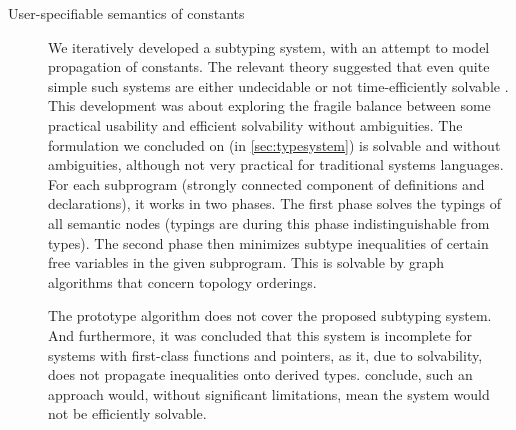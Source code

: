 \begin{description}
    \item[User-specifiable semantics of constants] We iteratively developed a subtyping system, with an attempt to model propagation of constants. The relevant theory suggested that even quite simple such systems are either undecidable or not time-efficiently solvable \cite{tiuryn1992subtype, frey1997subtype}. This development was about  exploring the fragile balance between some practical usability and efficient solvability without ambiguities. The formulation we concluded on (in \cref{sec:typesystem}) is solvable and without ambiguities, although not very practical for traditional systems languages. For each subprogram (strongly connected component of definitions and declarations), it works in two phases. The first phase solves the typings of all semantic nodes (typings are during this phase indistinguishable from types). The second phase then minimizes subtype inequalities of certain free variables in the given subprogram. This is solvable by graph algorithms that concern topology orderings.

    The prototype algorithm does not cover the proposed subtyping system. And furthermore, it was concluded that this system is incomplete for systems with first-class functions and pointers, as it, due to solvability, does not propagate inequalities onto derived types. \citet{tiuryn1992subtype, frey1997subtype} conclude, such an approach would, without significant limitations, mean the system would not be efficiently solvable.
\end{description}



